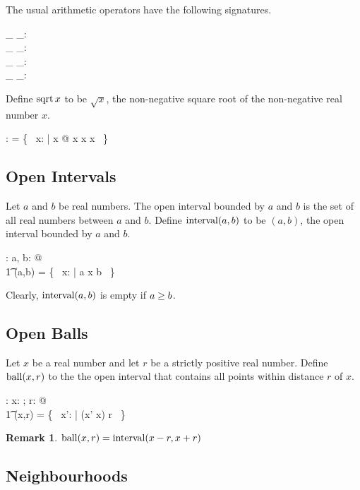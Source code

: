 \documentclass[11pt, oneside]{article}
\newtheorem*{remark}{Remark}
\begin{document}
The usual arithmetic operators have the following signatures.
\begin{axdef}
	\_ \addR \_: \R \cross \R \fun \R \\
	\_ \subR \_: \R \cross \R \fun \R \\
	\_ \mulR \_: \R \cross \R \fun \R \\
	\_ \divR \_: \R \cross \Rnz \fun \R
\end{axdef}

Define $\operatorname{sqrt}{x}$ to be $\sqrt{x}$, the non-negative square root of the non-negative real number $x$.
\begin{axdef}
	\sqrtR: \R \pfun \R
\where
	\sqrtR = \{~ x: \R | x \geR \zeroR @ x \mulR x \mapsto x ~\}
\end{axdef}

\subsection{Open Intervals}

Let $a$ and $b$ be real numbers.
The open interval bounded by $a$ and $b$ is the set of all real numbers between $a$ and $b$.
Define $\operatorname{interval}(a,b)$ to be $(a,b)$, the open interval bounded by $a$ and $b$. 

\begin{axdef}
	\intervalRR: \R \cross \R \fun \power \R
\where
	\forall a, b: \R @ \\
	\t1	\intervalRR(a,b) = \{~ x: \R | a \ltR x \ltR b ~\}
\end{axdef}
Clearly, $\operatorname{interval}(a,b)$ is empty if $a \mathrel{\geq} b$.

\subsection{Open Balls}
Let $x$ be a real number and let $r$ be a strictly positive real number.
Define $\operatorname{ball}(x,r)$ to the the open interval that contains all points within distance $r$ of $x$.
\begin{axdef}
	\ballRR: \R \cross \Rpos \fun \power \R
\where
	\forall x: \R; r: \Rpos @ \\
	\t1	\ballRR(x,r) = \{~ x': \R | \absR(x' \subR x) \ltR r ~\}
\end{axdef}
\begin{remark}
$\operatorname{ball}(x,r) = \operatorname{interval}(x-r, x+r)$
\end{remark}

\subsection{Neighbourhoods}
\end{document}

